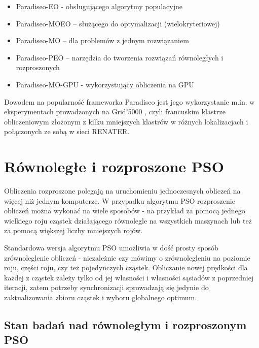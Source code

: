 \documentclass[12pt, twoside, openany, abstract=on]{report}
\theoremstyle{definition}
\begin{document}
\begin{itemize}
\item{Paradiseo-EO - obsługującego algorytmy populacyjne}
\item{Paradiseo-MOEO – służącego do optymalizacji (wielokryteriowej) \cite{ParadisEO-MOEO}} 
\item{Paradiseo-MO – dla problemów z jednym rozwiązaniem \cite{ParadisEO-MO}}
\item{Paradiseo-PEO – narzędzia do tworzenia rozwiązań równoległych i rozproszonych}
\item{Paradiseo-MO-GPU - wykorzystujący obliczenia na GPU \cite{ParadisEO-MO-GPU}}
\end{itemize}

Dowodem na popularność frameworka Paradiseo jest jego wykorzystanie m.in. w eksperymentach prowadzonych na Grid'5000 \cite{Grid5000, Grid5000Desc}, czyli francuskim klastrze obliczeniowym złożonym z kilku mniejszych klastrów w różnych lokalizacjach i połączonych ze sobą w sieci RENATER.

\section{Równoległe i rozproszone PSO}

Obliczenia rozproszone polegają na uruchomieniu jednoczesnych obliczeń na więcej niż jednym komputerze. W przypadku algorytmu PSO rozproszenie obliczeń można wykonać na wiele sposobów - na przykład za pomocą jednego wielkiego roju cząstek działającego równolegle na wszystkich maszynach lub też za pomocą większej liczby mniejszych rojów.  



Standardowa wersja algorytmu PSO umożliwia w dość prosty sposób zrównoleglenie obliczeń - niezależnie czy mówimy o zrównolegleniu na poziomie roju, części roju, czy też pojedynczych cząstek. Obliczanie nowej prędkości dla każdej z cząstek zależy tylko od jej własności i własności sąsiadów z poprzedniej iteracji, zatem potrzeby synchronizacji sprowadzają się jedynie do zaktualizowania zbioru cząstek i wyboru globalnego optimum. 

\subsection{Stan badań nad równoległym i rozproszonym PSO}
\end{document}
